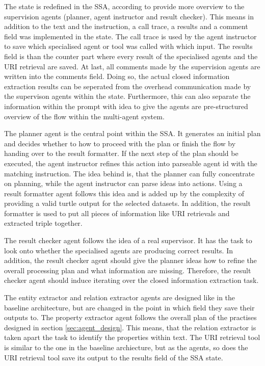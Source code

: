 \documentclass[a4paper,oneside,bibliography=totoc]{scrbook}
\begin{document}
The state is redefined in the \ac{SSA}, according to provide more overview to the supervision agents (planner, agent instructor and result checker). This means in addition to the text and the instruction, a call trace, a results and a comment field was implemented in the state. The call trace is used by the agent instructor to save which specialised agent or tool was called with which input. The results field is than the counter part where every result of the specialised agents and the URI retrieval are saved. At last, all comments made by the supervision agents are written into the comments field. Doing so, the actual closed information extraction results can be seperated from the overhead communication made by the supervison agents within the state. Furthermore, this can also separate the information within the prompt with idea to give the agents are pre-structured overview of the flow within the multi-agent system.

The planner agent is the central point within the \ac{SSA}. It generates an initial plan and decides whether to how to proceed with the plan or finish the flow by handing over to the result formatter. If the next step of the plan should be executed, the agent instructor refines this action into parseable agent id with the matching instruction. The idea behind is, that the planner can fully concentrate on planning, while the agent instructor can parse ideas into actions. Using a result formatter agent follows this idea and is added up by the complexity of providing a valid turtle output for the selected datasets. In addition, the result formatter is used to put all pieces of information like URI retrievals and extracted triple together.

The result checker agent follows the idea of a real supervisor. It has the task to look onto whether the specialised agents are producing correct results. In addition, the result checker agent should give the planner ideas how to refine the overall processing plan and what information are missing. Therefore, the result checker agent should induce iterating over the closed information extraction task.

The entity extractor and relation extractor agents are designed like in the baseline architecture, but are changed in the point in which field they save their outputs to. The property extractor agent follows the overall plan of the practises designed in section \ref{sec:agent_design}. This means, that the relation extractor is taken apart the task to identify the properties within text. The URI retrieval tool is similar to the one in the baseline archiecture, but as the agents, so does the URI retrieval tool save its output to the results field of the \ac{SSA} state.
\end{document}
